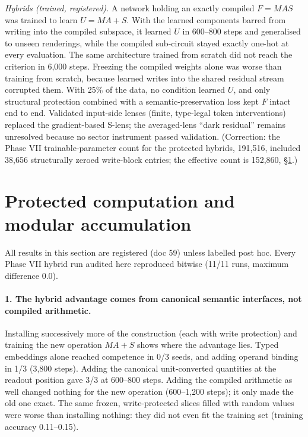 \documentclass[11pt]{article}
\begin{document}
\emph{Hybrids (trained, registered).} A network holding an exactly compiled $F=MAS$ was trained to learn
$U=MA+S$. With the learned components barred from writing into the compiled subspace, it learned $U$ in 600--800 steps
and generalised to unseen renderings, while the compiled sub-circuit stayed exactly one-hot at every evaluation. The
same architecture trained from scratch did not reach the criterion in 6,000 steps. Freezing the compiled weights alone
was worse than training from scratch, because learned writes into the shared residual stream corrupted them. With 25\%
of the data, no condition learned $U$, and only structural protection combined with a semantic-preservation loss kept
$F$ intact end to end. Validated input-side lenses (finite, type-legal token interventions) replaced the gradient-based
S-lens; the averaged-lens ``dark residual'' remains unresolved because no sector instrument passed validation.
(Correction: the Phase VII trainable-parameter count for the protected hybrids, 191,516, included 38,656 structurally
zeroed write-block entries; the effective count is 152,860, \S\ref{sec:protect}.)

\section{Protected computation and modular accumulation}\label{sec:protect}
All results in this section are registered (doc 59) unless labelled post hoc. Every Phase VII hybrid run audited
here reproduced bitwise (11/11 runs, maximum difference 0.0).

\paragraph{1. The hybrid advantage comes from canonical semantic interfaces, not compiled arithmetic.} Installing
successively more of the construction (each with write protection) and training the new operation $MA+S$ shows where
the advantage lies. Typed embeddings alone reached competence in 0/3 seeds, and adding operand binding in 1/3 (3,800
steps). Adding the canonical unit-converted quantities at the readout position gave 3/3 at 600--800 steps. Adding the
compiled arithmetic as well changed nothing for the new operation (600--1,200 steps); it only made the old one exact.
The same frozen, write-protected slices filled with random values were worse than installing nothing: they did not
even fit the training set (training accuracy 0.11--0.15).
\end{document}
